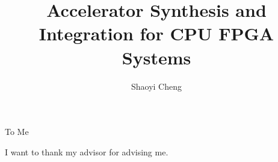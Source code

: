 \documentclass{ucbthesis}
\begin{document}

\title{Accelerator Synthesis and Integration for CPU FPGA Systems }
\author{Shaoyi Cheng}



\maketitle

\approvalpage

\copyrightpage



\begin{frontmatter}

\begin{dedication}
\null\vfil
\begin{center}
To Me\\\vspace{12pt}
\end{center}
\vfil\null
\end{dedication}

\tableofcontents
\clearpage
\listoffigures
\clearpage
\listoftables
\clearpage


\begin{acknowledgements}
I want to thank my advisor for advising me.
\end{acknowledgements}

\end{frontmatter}

\pagestyle{headings}






%




\printbibliography
\end{document}
